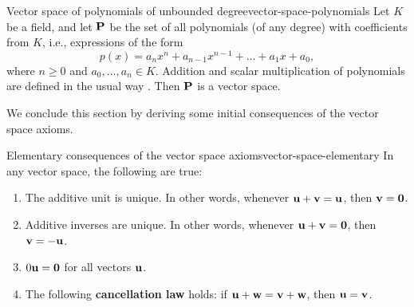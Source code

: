 \begin{example}{Vector space of polynomials of unbounded degree}{vector-space-polynomials}
  Let $K$ be a field, and let $\mathbf{P}$%
   be the set of all polynomials%
   (of any degree) with coefficients from $K$, i.e.,
  expressions of the form
  \begin{equation*}
    p(x) = a_nx^n + a_{n-1}x^{n-1} + \ldots + a_1x + a_0,
  \end{equation*}
  where $n\geq 0$ and $a_0,\ldots,a_n\in K$. Addition and scalar
  multiplication of polynomials are defined in the usual way
  .
  Then $\mathbf{P}$ is a vector space.
\end{example}

We conclude this section by deriving some initial consequences of the
vector space axioms.

\begin{proposition}{Elementary consequences of the vector space axioms}{vector-space-elementary}
  In any vector space, the following are true:
  \begin{enumerate}
  \item The additive unit is unique. In other words, whenever
    $\mbox{\bf u}+\mbox{\bf v}=\mbox{\bf u}$, then $\mbox{\bf v}=\mbox{\bf 0}$.
  \item Additive inverses are unique. In other words, whenever
    $\mbox{\bf u}+\mbox{\bf v}=\mbox{\bf 0}$, then $\mbox{\bf v}=-\mbox{\bf u}$. 
  \item $0\mbox{\bf u}=\mbox{\bf 0}$ for all vectors $\mbox{\bf u}$.
  \item The following \textbf{cancellation law}%
    holds: if $\mbox{\bf u} + \mbox{\bf w} = \mbox{\bf v} + \mbox{\bf w}$, then
    $\mbox{\bf u} = \mbox{\bf v}$.
  \end{enumerate}
\end{proposition}

